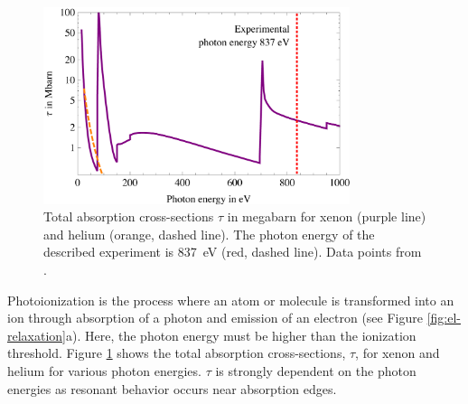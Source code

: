 \begin{figure}
	\centering
		\includegraphics[width=0.80\textwidth]{images/photoionization.png}
	\caption[Total absorption cross-sections for helium and xenon.]{Total absorption cross-sections $\tau$ in megabarn for xenon (purple line) and helium (orange, dashed line). The photon energy of the described experiment is \SI{837}{\electronvolt} (red, dashed line). Data points from \citep{Elettra-2016-Website,Yeh-1985-AtmDat,Yeh-1993-GBSP}.}
	\label{fig:photoionization}
\end{figure}
%
Photoionization is the process where an atom or molecule is transformed into an ion through absorption of a photon and emission of an electron (see Figure \ref{fig:el-relaxation}a). Here, the photon energy must be higher than the ionization threshold. Figure \ref{fig:photoionization} shows the total absorption cross-sections, $\tau$, for xenon and helium for various photon energies. $\tau$ is strongly dependent on the photon energies as resonant behavior occurs near absorption edges.
